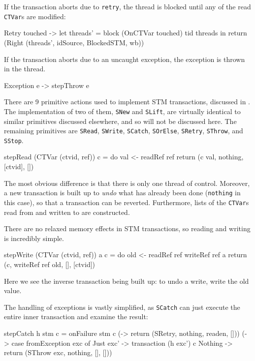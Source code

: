 If the transaction aborts due to \verb|retry|, the thread is blocked
until any of the read \verb|CTVar|s are modified:

\begin{haskellcode}
    Retry touched ->
      let threads' = block (OnCTVar touched) tid threads
      in return (Right (threads', idSource, BlockedSTM, wb))
\end{haskellcode}

If the transaction aborts due to an uncaught exception, the exception
is thrown in the thread.

\begin{haskellcode}
    Exception e -> stepThrow e
\end{haskellcode}

There are 9 primitive actions used to implement STM transactions,
discussed in . The implementation of two of
them, \verb|SNew| and \verb|SLift|, are virtually identical to similar
primitives discussed elsewhere, and so will not be discussed here. The
remaining primitives are \verb|SRead|, \verb|SWrite|, \verb|SCatch|,
\verb|SOrElse|, \verb|SRetry|, \verb|SThrow|, and \verb|SStop|.

\begin{haskellcode}
stepRead (CTVar (ctvid, ref)) c = do
  val <- readRef ref
  return (c val, nothing, [ctvid], [])
\end{haskellcode}

The most obvious difference is that there is only one thread of
control. Moreover, a new transaction is built up to \emph{undo} what
has already been done (\verb|nothing| in this case), so that a
transaction can be reverted. Furthermore, lists of the \verb|CTVar|s
read from and written to are constructed.

There are no relaxed memory effects in STM transactions, so reading
and writing is incredibly simple.

\begin{haskellcode}
stepWrite (CTVar (ctvid, ref)) a c = do
  old <- readRef ref
  writeRef ref a
  return (c, writeRef ref old, [], [ctvid])
\end{haskellcode}

Here we see the inverse transaction being built up: to undo a write,
write the old value.

The handling of exceptions is vastly simplified, as \verb|SCatch| can
just execute the entire inner transaction and examine the result:

\begin{haskellcode}
stepCatch h stm c = onFailure stm c
  (\readen -> return (SRetry, nothing, readen, []))
  (\exc    -> case fromException exc of
    Just exc' -> transaction (h exc') c
    Nothing   -> return (SThrow exc, nothing, [], []))
\end{haskellcode}

